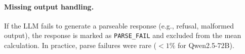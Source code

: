 \documentclass[11pt]{article}
\begin{document}
\paragraph{Missing output handling.}
If the LLM fails to generate a parseable response (e.g., refusal, malformed output), the response is marked as \texttt{PARSE\_FAIL} and excluded from the mean calculation. In practice, parse failures were rare ($<1\%$ for Qwen2.5-72B).

\clearpage


\end{document}
